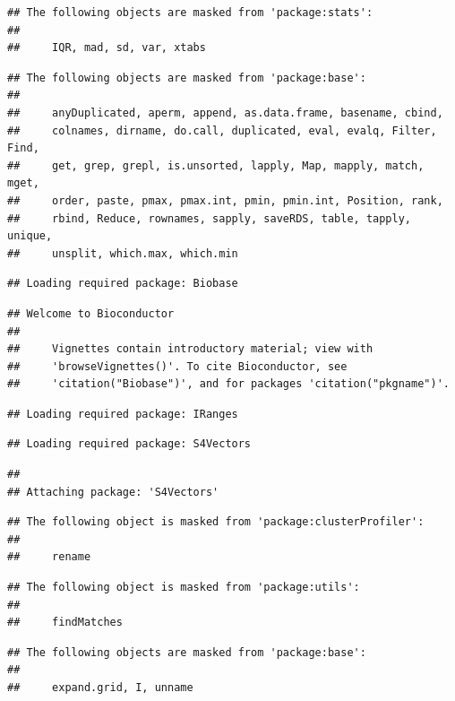 \documentclass[
]{article}
\begin{document}
\begin{verbatim}
## The following objects are masked from 'package:stats':
## 
##     IQR, mad, sd, var, xtabs
\end{verbatim}

\begin{verbatim}
## The following objects are masked from 'package:base':
## 
##     anyDuplicated, aperm, append, as.data.frame, basename, cbind,
##     colnames, dirname, do.call, duplicated, eval, evalq, Filter, Find,
##     get, grep, grepl, is.unsorted, lapply, Map, mapply, match, mget,
##     order, paste, pmax, pmax.int, pmin, pmin.int, Position, rank,
##     rbind, Reduce, rownames, sapply, saveRDS, table, tapply, unique,
##     unsplit, which.max, which.min
\end{verbatim}

\begin{verbatim}
## Loading required package: Biobase
\end{verbatim}

\begin{verbatim}
## Welcome to Bioconductor
## 
##     Vignettes contain introductory material; view with
##     'browseVignettes()'. To cite Bioconductor, see
##     'citation("Biobase")', and for packages 'citation("pkgname")'.
\end{verbatim}

\begin{verbatim}
## Loading required package: IRanges
\end{verbatim}

\begin{verbatim}
## Loading required package: S4Vectors
\end{verbatim}

\begin{verbatim}
## 
## Attaching package: 'S4Vectors'
\end{verbatim}

\begin{verbatim}
## The following object is masked from 'package:clusterProfiler':
## 
##     rename
\end{verbatim}

\begin{verbatim}
## The following object is masked from 'package:utils':
## 
##     findMatches
\end{verbatim}

\begin{verbatim}
## The following objects are masked from 'package:base':
## 
##     expand.grid, I, unname
\end{verbatim}
\end{document}

